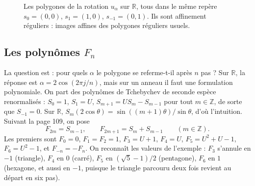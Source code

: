 \documentclass[11pt,a4paper]{amsart}
\theoremstyle{definition}
\theoremstyle{plain}
\theoremstyle{remark}
\newcommand{\Z}{\mathbb Z}
\newcommand{\R}{\mathbb R}
\begin{document}
\begin{figure}[ht]
\centering
{}
\caption{Les polygones de la rotation $u_\alpha$ sur $\R$, tous dans le même repère $s_0 = (0,0)$, $s_1 = (1,0)$, $s_{-1} = (0,1)$. Ils sont affinement réguliers : images affines des polygones réguliers usuels.}\label{fig:polygones}
\end{figure}

\subsection{Les polynômes \texorpdfstring{$F_n$}{Fn}}

La question est : pour quels $\alpha$ le polygone se referme-t-il après $n$ pas ? Sur $\R$, la réponse est $\alpha = 2\cos(2\pi j/n)$, mais sur un anneau il faut une formulation polynomiale. On part des polynômes de Tchebychev de seconde espèce renormalisés : $S_0 = 1$, $S_1 = U$, $S_{m+1} = US_m - S_{m-1}$ pour tout $m \in \Z$, de sorte que $S_{-1} = 0$. Sur $\R$, $S_m(2\cos\theta) = \sin((m+1)\theta)/\sin\theta$, d'où l'intuition. Suivant la page 109, on pose
\[
F_{2m} = S_{m-1}, \qquad F_{2m+1} = S_m + S_{m-1} \qquad (m \in \Z).
\]
Les premiers sont $F_0 = 0$, $F_1 = F_2 = 1$, $F_3 = U + 1$, $F_4 = U$, $F_5 = U^2 + U - 1$, $F_6 = U^2 - 1$, et $F_{-n} = -F_n$. On reconnaît les valeurs de l'exemple : $F_3$ s'annule en $-1$ (triangle), $F_4$ en $0$ (carré), $F_5$ en $(\sqrt5 - 1)/2$ (pentagone), $F_6$ en $1$ (hexagone, et aussi en $-1$, puisque le triangle parcouru deux fois revient au départ en six pas).
\end{document}
